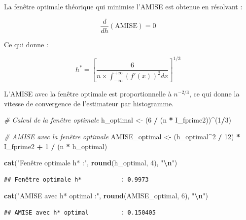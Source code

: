 \documentclass[
  12pt,
]{article}
\newenvironment{Shaded}{\begin{snugshade}}{\end{snugshade}}
\newcommand{\CommentTok}[1]{\textcolor[rgb]{0.56,0.35,0.01}{\textit{#1}}}
\newcommand{\DecValTok}[1]{\textcolor[rgb]{0.00,0.00,0.81}{#1}}
\newcommand{\FunctionTok}[1]{\textcolor[rgb]{0.13,0.29,0.53}{\textbf{#1}}}
\newcommand{\NormalTok}[1]{#1}
\newcommand{\OtherTok}[1]{\textcolor[rgb]{0.56,0.35,0.01}{#1}}
\newcommand{\SpecialCharTok}[1]{\textcolor[rgb]{0.81,0.36,0.00}{\textbf{#1}}}
\newcommand{\StringTok}[1]{\textcolor[rgb]{0.31,0.60,0.02}{#1}}
\begin{document}
La fenêtre optimale théorique qui minimise l'AMISE est obtenue en
résolvant :

\[
\frac{d}{dh}(\text{AMISE}) = 0
\]

Ce qui donne :

\[
h^* = \left[\frac{6}{n \times \int_{-\infty}^{+\infty} (f'(x))^2 dx}\right]^{1/3}
\]

L'AMISE avec la fenêtre optimale est proportionnelle à \(n^{-2/3}\), ce
qui donne la vitesse de convergence de l'estimateur par histogramme.

\begin{Shaded}
\begin{Highlighting}[]
\CommentTok{\# Calcul de la fenêtre optimale}
\NormalTok{h\_optimal }\OtherTok{\textless{}{-}}\NormalTok{ (}\DecValTok{6} \SpecialCharTok{/}\NormalTok{ (n }\SpecialCharTok{*}\NormalTok{ I\_fprime2))}\SpecialCharTok{\^{}}\NormalTok{(}\DecValTok{1}\SpecialCharTok{/}\DecValTok{3}\NormalTok{)}

\CommentTok{\# AMISE avec la fenêtre optimale}
\NormalTok{AMISE\_optimal }\OtherTok{\textless{}{-}}\NormalTok{ (h\_optimal}\SpecialCharTok{\^{}}\DecValTok{2} \SpecialCharTok{/} \DecValTok{12}\NormalTok{) }\SpecialCharTok{*}\NormalTok{ I\_fprime2 }\SpecialCharTok{+} \DecValTok{1} \SpecialCharTok{/}\NormalTok{ (n }\SpecialCharTok{*}\NormalTok{ h\_optimal)}

\FunctionTok{cat}\NormalTok{(}\StringTok{"Fenêtre optimale h*           :"}\NormalTok{, }\FunctionTok{round}\NormalTok{(h\_optimal, }\DecValTok{4}\NormalTok{), }\StringTok{"}\SpecialCharTok{\textbackslash{}n}\StringTok{"}\NormalTok{)}
\end{Highlighting}
\end{Shaded}

\begin{verbatim}
## Fenêtre optimale h*           : 0.9973
\end{verbatim}

\begin{Shaded}
\begin{Highlighting}[]
\FunctionTok{cat}\NormalTok{(}\StringTok{"AMISE avec h* optimal         :"}\NormalTok{, }\FunctionTok{round}\NormalTok{(AMISE\_optimal, }\DecValTok{6}\NormalTok{), }\StringTok{"}\SpecialCharTok{\textbackslash{}n}\StringTok{"}\NormalTok{)}
\end{Highlighting}
\end{Shaded}

\begin{verbatim}
## AMISE avec h* optimal         : 0.150405
\end{verbatim}
\end{document}
